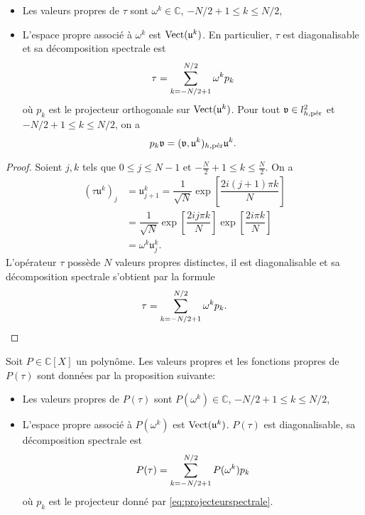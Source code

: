 \begin{proposition}
\begin{itemize}
\item Les valeurs propres de $\tau$ sont $\omega^k \in \mathbb{C}$, $-N/2 + 1 \leq k \leq N/2$,

\item L'espace propre associé à $\omega^k$ est $\Vect (\mathfrak{u}^k)$. En particulier, $\tau$ est diagonalisable et sa décomposition spectrale est
\begin{equation}
\tau = \gsum_{k = -N/2+1}^{N/2} \omega^k p_k
\end{equation}
où $p_k$ est le projecteur orthogonale sur $\Vect (\mathfrak{u}^k)$. Pour tout $\mathfrak{v} \in l^2_{h,\per}$ et $-N/2+1 \leq k \leq N/2$, on a
\begin{equation}
p_k \mathfrak{v} = (\mathfrak{v},\mathfrak{u}^k)_{h,\per}\mathfrak{u}^k.
\label{eq:projecteurspectrale}
\end{equation}
\end{itemize}
\label{prop:eigenvaluevector_tau}
\end{proposition}

\begin{proof}
Soient $j, k$ tels que $0 \leq j \leq N-1$ et $-\frac{N}{2}+1 \leq k \leq \frac{N}{2}$. On a
\begin{align*}
(\tau \mathfrak{u}^k)_j & = \mathfrak{u}^k_{j+1}= \dfrac{1}{\sqrt{N}}\exp \left[ \dfrac{2 i (j+1)  \pi k}{N} \right] \\
	& = \dfrac{1}{\sqrt{N}} \exp \left[ \dfrac{2 i j \pi k}{N} \right] \exp \left[ \dfrac{2 i \pi k}{N} \right]\\
	& = \omega^k \mathfrak{u}_j^k.
\end{align*}
L'opérateur $\tau$ possède $N$ valeurs propres distinctes, il est diagonalisable et sa décomposition spectrale s'obtient par la formule
\begin{equation*}
\tau = \gsum_{k = -N/2+1}^{N/2} \omega^k p_k.
\end{equation*}
\end{proof}

Soit $P \in \mathbb{C}[X]$ un polynôme. Les valeurs propres et les fonctions propres de $P(\tau)$ sont données par la proposition suivante:
\begin{proposition}
\begin{itemize}
\item Les valeurs propres de $P(\tau)$ sont $P(\omega^k) \in \mathbb{C}$, $-N/2 + 1 \leq k \leq N/2$,

\item L'espace propre associé à $P(\omega^k)$ est $\Vect (\mathfrak{u}^k)$. $P(\tau)$ est diagonalisable, sa décomposition spectrale est
\begin{equation}
P(\tau) = \gsum_{k=-N/2+1}^{N/2} P(\omega^k) p_k
\label{eq:formule_diagPtau}
\end{equation}
où $p_k$ est le projecteur donné par \eqref{eq:projecteurspectrale}.
\end{itemize}
\label{prop:eigen_Ptau}
\end{proposition}

